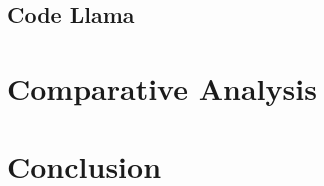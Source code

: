 \documentclass[11pt,a4paper]{article}
\begin{document}

\subsection{Code Llama}
\label{sec:codellama}


\section{Comparative Analysis}
\label{sec:comparison}



\section{Conclusion}
\label{sec:conclusion}



\end{document}

